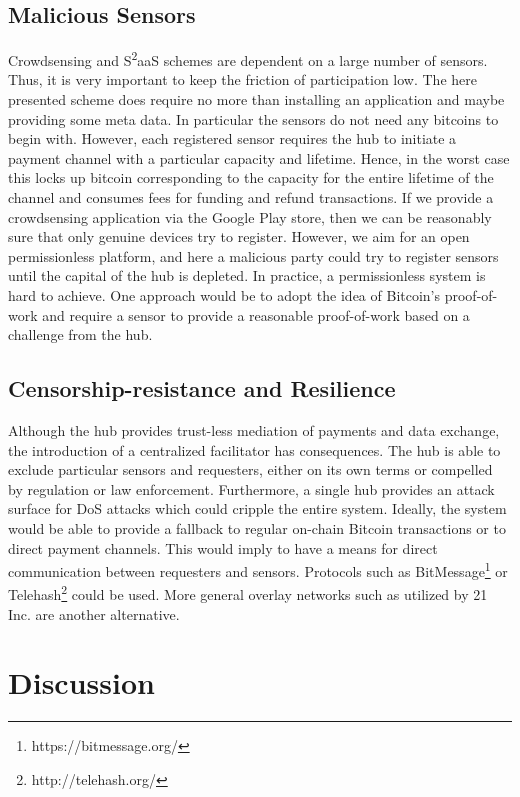 \subsection{Malicious Sensors}
\label{sec:s2aas_micro_eval_malsens}

Crowdsensing and S\textsuperscript{2}aaS schemes are dependent on a large number of sensors. Thus, it is very important to keep the friction of participation low. The here presented scheme does require no more than installing an application and maybe providing some meta data. In particular the sensors do not need any bitcoins to begin with. However, each registered sensor requires the hub to initiate a payment channel with a particular capacity and lifetime. Hence, in the worst case this locks up bitcoin corresponding to the capacity for the entire lifetime of the channel and consumes fees for funding and refund transactions. If we provide a crowdsensing application via the Google Play store, then we can be reasonably sure that only genuine devices try to register. However, we aim for an open permissionless platform, and here a malicious party could try to register sensors until the capital of the hub is depleted. In practice, a permissionless system is hard to achieve. One approach would be to adopt the idea of Bitcoin's proof-of-work and require a sensor to provide a reasonable proof-of-work based on a challenge from the hub.

\subsection{Censorship-resistance and Resilience}

Although the hub provides trust-less mediation of payments and data exchange, the introduction of a centralized facilitator has consequences. The hub is able to exclude particular sensors and requesters, either on its own terms or compelled by regulation or law enforcement. Furthermore, a single hub provides an attack surface for \ac{DoS} attacks which could cripple the entire system. Ideally, the system would be able to provide a fallback to regular on-chain Bitcoin transactions or to direct payment channels. This would imply to have a means for direct communication between requesters and sensors. Protocols such as BitMessage\footnote{https://bitmessage.org/} or Telehash\footnote{http://telehash.org/} could be used. More general overlay networks such as utilized by 21 Inc. are another alternative.

\section{Discussion}
\label{sec:trustlessdiscussion}


